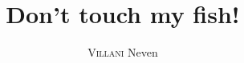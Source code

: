 \documentclass[a4paper,french]{article}
\title{Don't touch my fish!}
\author{\textsc{Villani} Neven}
\date{}
\begin{document}
\maketitle







\begin{center}

\end{center}
\end{document}
